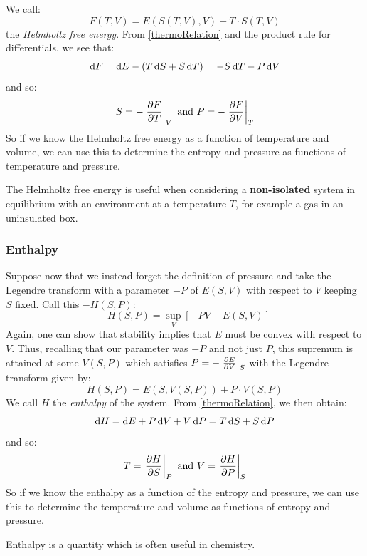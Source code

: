 \documentclass[../main.tex]{subfiles}
\begin{document}
We call:
\[
  F(T, V) = E(S(T, V), V) - T \cdot S(T, V)
\]
the \textit{Helmholtz free energy}.
From \cref{thermoRelation} and the product rule for differentials, we see that:
\[
  \d{F} = \d{E} - (T \d{S} + S \d{T}) = -S \d{T} - P \d{V}
\]
and so:
\[
  S = - \at{\pderiv{F}{T}}{V} \text{ and } P = - \at{\pderiv{F}{V}}{T}
\]
So if we know the Helmholtz free energy as a function of temperature and volume, we can use this to determine the entropy and pressure as functions of temperature and pressure.

\begin{remark}[Use]
  \nonexaminable
  The Helmholtz free energy is useful when considering a \textbf{non-isolated} system in equilibrium with an environment at a temperature $T$, for example a gas in an uninsulated box.
\end{remark}

\subsubsection{Enthalpy}
Suppose now that we instead forget the definition of pressure and take the Legendre transform with a parameter $-P$ of $E(S, V)$ with respect to $V$ keeping $S$ fixed.
Call this $-H(S, P)$:
\[
  -H(S, P) = \sup_{V} [-PV - E(S, V)]
\]
Again, one can show that stability implies that $E$ must be convex with respect to $V$.
Thus, recalling that our parameter was $-P$ and not just $P$, this supremum is attained at some $V(S, P)$ which satisfies $P = - \at{\pderiv{E}{V}}{S}$ with the Legendre transform given by:
\[
  H(S, P) = E(S, V(S, P)) + P \cdot V(S, P)
\]
We call $H$ the \textit{enthalpy} of the system.
From \cref{thermoRelation}, we then obtain:
\[
  \d{H} = \d{E} + P \d{V} + V \d{P} = T \d{S} + S \d{P}
\]
and so:
\[
  T = \at{\pderiv{H}{S}}{P} \text{ and } V = \at{\pderiv{H}{P}}{S}
\]
So if we know the enthalpy as a function of the entropy and pressure, we can use this to determine the temperature and volume as functions of entropy and pressure.
\begin{remark}[Use]
  Enthalpy is a quantity which is often useful in chemistry.
\end{remark}
\end{document}
